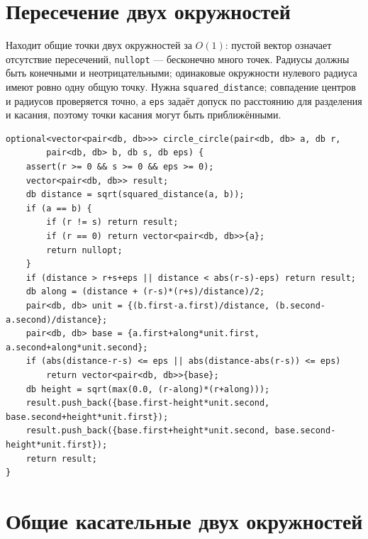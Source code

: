 \section{Пересечение двух окружностей}
Находит общие точки двух окружностей за $O(1)$: пустой вектор означает отсутствие пересечений, \texttt{nullopt} --- бесконечно много точек.
Радиусы должны быть конечными и неотрицательными; одинаковые окружности нулевого радиуса имеют ровно одну общую точку.
Нужна \texttt{squared\_distance}; совпадение центров и радиусов проверяется точно, а \texttt{eps} задаёт допуск по расстоянию для разделения и касания, поэтому точки касания могут быть приближёнными.
\begin{lstlisting}[name=geometry_circle_circle]
optional<vector<pair<db, db>>> circle_circle(pair<db, db> a, db r,
        pair<db, db> b, db s, db eps) {
    assert(r >= 0 && s >= 0 && eps >= 0);
    vector<pair<db, db>> result;
    db distance = sqrt(squared_distance(a, b));
    if (a == b) {
        if (r != s) return result;
        if (r == 0) return vector<pair<db, db>>{a};
        return nullopt;
    }
    if (distance > r+s+eps || distance < abs(r-s)-eps) return result;
    db along = (distance + (r-s)*(r+s)/distance)/2;
    pair<db, db> unit = {(b.first-a.first)/distance, (b.second-a.second)/distance};
    pair<db, db> base = {a.first+along*unit.first, a.second+along*unit.second};
    if (abs(distance-r-s) <= eps || abs(distance-abs(r-s)) <= eps)
        return vector<pair<db, db>>{base};
    db height = sqrt(max(0.0, (r-along)*(r+along)));
    result.push_back({base.first-height*unit.second, base.second+height*unit.first});
    result.push_back({base.first+height*unit.second, base.second-height*unit.first});
    return result;
}
\end{lstlisting}
\fi

%

\iffalse
\section{Общие касательные двух окружностей}
